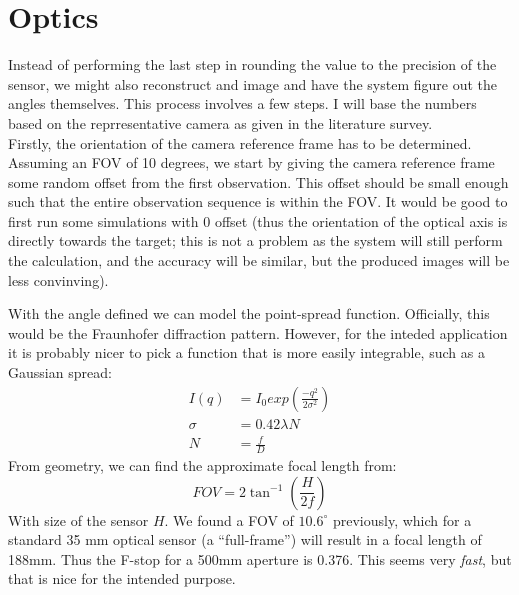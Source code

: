 \documentclass[a4paper,10pt]{article}
\begin{document}
\section{Optics}

Instead of performing the last step in rounding the value to the precision of the sensor, we might also reconstruct and image and have the system figure out the angles themselves. This process involves a few steps. I will base the numbers based on the reprresentative camera as given in the literature survey.\\

Firstly, the orientation of the camera reference frame has to be determined. Assuming an FOV of 10 degrees, we start by giving the camera reference frame some random offset from the first observation. This offset should be small enough such that the entire observation sequence is within the FOV. It would be good to first run some simulations with 0 offset (thus the orientation of the optical axis is directly towards the target; this is not a problem as the system will still perform the calculation, and the accuracy will be similar, but the produced images will be less convinving).

With the angle defined we can model the point-spread function. Officially, this would be the Fraunhofer diffraction pattern. However, for the inteded application it is probably nicer to pick a function that is more easily integrable, such as a Gaussian spread:
\begin{align}
 I(q) &= I_0 exp\left(\frac{-q^2}{2\sigma^2}\right) \\
 \sigma &= 0.42 \lambda N \\
 N &= \frac{f}{D}
\end{align}
From geometry, we can find the approximate focal length from:
\begin{equation}
 FOV = 2 \tan ^{-1} \left(\frac{H}{2f}\right)
\end{equation}
With size of the sensor $H$. We found a FOV of $10.6^\circ$ previously, which for a standard 35 mm optical sensor (a ``full-frame'') will result in a focal length of 188mm. Thus the F-stop for a 500mm aperture is 0.376. This seems very
\textit{fast}, but that is nice for the intended purpose. \\
\end{document}
